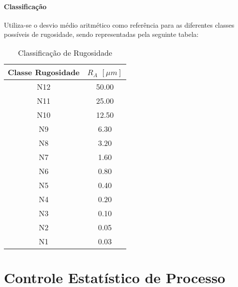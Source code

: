 \documentclass{article}
\begin{document}
            \paragraph{Classificação}Utiliza-se o desvio médio aritmético como referência para as diferentes classes possíveis de rugosidade, sendo representadas pela seguinte tabela:
                \begin{table}[H]
                    \centering
                    \begin{tabular}[]{c | c}\hline
                        Classe Rugosidade & $R_{A}$ $[\mu m]$\\\hline
                        N12               & 50.00\\
                        N11               & 25.00\\
                        N10               & 12.50\\
                        N9                &  6.30\\
                        N8                &  3.20\\
                        N7                &  1.60\\
                        N6                &  0.80\\
                        N5                &  0.40\\
                        N4                &  0.20\\
                        N3                &  0.10\\
                        N2                &  0.05\\
                        N1                &  0.03\\\hline
                    \end{tabular}
                    \caption{Classificação de Rugosidade}
                \end{table}

    \section{Controle Estatístico de Processo}
\end{document}
